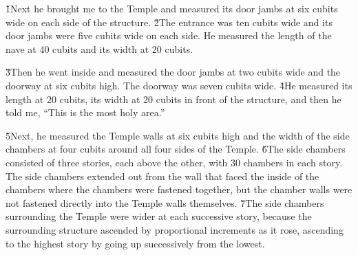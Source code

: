 \v{1}Next he brought me to the Temple and measured its door jambs at six cubits wide on each side of the structure. \v{2}The entrance was ten cubits wide and its door jambs were five cubits wide on each side. He measured the length of the nave at 40 cubits and its width at 20 cubits.

\v{3}Then he went inside and measured the door jambs at two cubits wide and the doorway at six cubits high. The doorway was seven cubits wide. \v{4}He measured its length at 20 cubits, its width at 20 cubits in front of the structure, and then he told me, ``This is the most holy area.''

\v{5}Next, he measured the Temple walls at six cubits high and the width of the side chambers at four cubits around all four sides of the Temple. \v{6}The side chambers consisted of three stories, each above the other, with 30 chambers in each story. The side chambers extended out from the wall that faced the inside of the chambers where the chambers were fastened together, but the chamber walls were not fastened directly into the Temple walls themselves. \v{7}The side chambers surrounding the Temple were wider at each successive story, because the surrounding structure ascended by proportional increments as it rose, ascending to the highest story by going up successively from the lowest.

